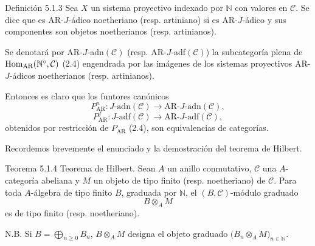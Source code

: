 \begin{statement}{Definición 5.1.3}
Sea \(X\) un sistema proyectivo indexado por \(\mathbb N\) con valores en \(\mathcal C\). Se dice que es AR-\(J\)-ádico noetheriano (resp. artiniano) si es AR-\(J\)-ádico y sus componentes son objetos noetherianos (resp. artinianos).
\end{statement}

Se denotará por AR-\(J\)-adn\((\mathcal C)\) (resp. AR-\(J\)-adf\((\mathcal C)\)) la subcategoría plena de \(\operatorname{Hom}_{\mathrm{AR}}(\mathbb N^\circ,\mathcal C)\) (2.4) engendrada por las imágenes de los sistemas proyectivos AR-\(J\)-ádicos noetherianos (resp. artinianos).

Entonces es claro que los funtores canónicos
\[
P^n_{\mathrm{AR}}:J\text{-adn}(\mathcal C)\longrightarrow \mathrm{AR}\text{-}J\text{-adn}(\mathcal C),
\]
\[
P^f_{\mathrm{AR}}:J\text{-adf}(\mathcal C)\longrightarrow \mathrm{AR}\text{-}J\text{-adf}(\mathcal C),
\]
obtenidos por restricción de \(P_{\mathrm{AR}}\) (2.4), son equivalencias de categorías.

Recordemos brevemente el enunciado y la demostración del teorema de Hilbert.

\begin{statement}{Teorema 5.1.4}
Teorema de Hilbert. Sean \(A\) un anillo conmutativo, \(\mathcal C\) una \(A\)-categoría abeliana y \(M\) un objeto de tipo finito (resp. noetheriano) de \(\mathcal C\). Para toda \(A\)-álgebra de tipo finito \(B\), graduada por \(\mathbb N\), el \((B,\mathcal C)\)-módulo graduado
\[
B\otimes_A M
\]
es de tipo finito (resp. noetheriano).

N.B. Si \(B=\bigoplus_{n\ge0}B_n\), \(B\otimes_A M\) designa el objeto graduado \(\bigl(B_n\otimes_A M\bigr)_{n\in\mathbb N}\).
\end{statement}
